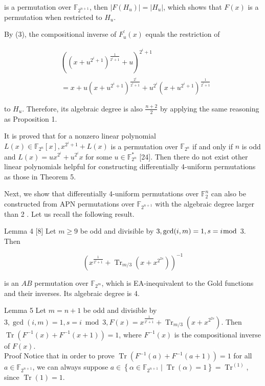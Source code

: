 \documentclass[10pt]{article}
\begin{document}
is a permutation over $\mathbb{F}_{2^{n+1}}$, then $\left|F\left(H_{u}\right)\right|=\left|H_{u}\right|$, which shows that $F(x)$ is a permutation when restricted to $H_{u}$.

By (3), the compositional inverse of $F_{u}^{\prime}(x)$ equals the restriction of

$$
\begin{aligned}
& \left(\left(x+u^{2^{i}+1}\right)^{\frac{1}{2^{i}+1}}+u\right)^{2^{i}+1} \\
& =x+u\left(x+u^{2^{i}+1}\right)^{\frac{2^{i}}{2^{i}+1}}+u^{2^{i}}\left(x+u^{2^{i}+1}\right)^{\frac{1}{2^{i}+1}}
\end{aligned}
$$

to $H_{u}$. Therefore, its algebraic degree is also $\frac{n+2}{2}$ by applying the same reasoning as Proposition 1.

It is proved that for a nonzero linear polynomial $L(x) \in \mathbb{F}_{2^{n}}[x], x^{2^{i}+1}+L(x)$ is a permutation over $\mathbb{F}_{2^{n}}$ if and only if $n$ is odd and $L(x)=u x^{2^{i}}+u^{2^{i}} x$ for some $u \in \mathbb{F}_{2^{n}}^{*}$ [24]. Then there do not exist other linear polynomials helpful for constructing differentially 4-uniform permutations as those in Theorem 5.

Next, we show that differentially 4-uniform permutations over $\mathbb{F}_{2}^{n}$ can also be constructed from APN permutations over $\mathbb{F}_{2^{n+1}}$ with the algebraic degree larger than 2 . Let us recall the following result.

Lemma 4 [8] Let $m \geq 9$ be odd and divisible by $3, \operatorname{gcd}(i, m)=1, s=i \bmod$ 3. Then

$$
\left(x^{\frac{1}{2^{i}+1}}+\operatorname{Tr}_{m / 3}\left(x+x^{2^{2 s}}\right)\right)^{-1}
$$

is an $A B$ permutation over $\mathbb{F}_{2^{m}}$, which is EA-inequivalent to the Gold functions and their inverses. Its algebraic degree is 4.

Lemma 5 Let $m=n+1$ be odd and divisible by $3, \operatorname{gcd}(i, m)=1, s=i \bmod 3, F(x)= x^{\frac{1}{2^{i}+1}}+\operatorname{Tr}_{m / 3}\left(x+x^{2^{2 s}}\right)$. Then $\operatorname{Tr}\left(F^{-1}(x)+F^{-1}(x+1)\right)=1$, where $F^{-1}(x)$ is the compositional inverse of $F(x)$.\\
Proof Notice that in order to prove $\operatorname{Tr}\left(F^{-1}(a)+F^{-1}(a+1)\right)=1$ for all $a \in \mathbb{F}_{2^{n+1}}$, we can always suppose $a \in\left\{\alpha \in \mathbb{F}_{2^{n+1}} \mid \operatorname{Tr}(\alpha)=1\right\}=\operatorname{Tr}^{(1)}$, since $\operatorname{Tr}(1)=1$.
\end{document}
